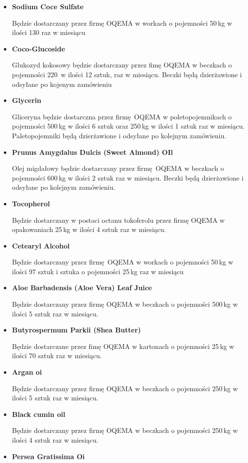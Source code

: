 \begin{itemize}
	\item \textbf{Sodium Coce Sulfate}

		Będzie dostarczany przez firmę \textsf{OQEMA} w workach o pojemności 50\,kg w ilości 130 raz w miesiącu
	\item \textbf{Coco-Glucoside}

		Glukozyd kokosowy będzie dostarczany przez fimę \textsf{OQEMA} w beczkach o pojemności 220\, w ilości 12 sztuk, raz w miesiącu. Beczki będą dzierżawione i odsyłane po kojenym zamówieniu
	\item \textbf{Glycerin}

		Gliceryna będzie dostarczna przez firmę \textsf{OQEMA} w poletopojemnikach o pojemności 500\,kg w ilości 6 sztuk oraz 250\,kg w ilości 1 sztuk raz w miesiącu. Paletopojemniki będą dzierżawione i odsyłane po kolejnym zamówieniu.
	\item \textbf{Prunus Amygdalus Dulcis (Sweet Almond) OIl}

		Olej migdałowy będzie dostarczany przez firmę \textsf{OQEMA} w beczkach o pojemności 600\,kg w ilości 2 sztuk raz w miesiącu. Beczki będą dzierżawione i odsyłane po kolejnym zamówieniu.
	\item \textbf{Tocopherol}

		Będzie dostarczany w postaci octanu tokoferolu przez firmę \textsf{OQEMA} w opakowaniach 25\,kg w ilości 4 sztuk raz w miesiącu.
	\item \textbf{Cetearyl Alcohol}

		Będzie dostarczany przez firmę \textsf{OQEMA} w workach o pojemności 50\,kg w ilości 97 sztuk i sztuka o pojemności 25\,kg raz w miesiącu
	\item \textbf{Aloe Barbadensis (Aloe Vera) Leaf Juice}

	Będzie dostarczany przez firmę \textsf{OQEMA} w beczkach o pojemności 500\,kg w ilości 5 sztuk raz w miesiącu.
	\item \textbf{Butyrospermum Parkii (Shea Butter)}

	Będzie dostarczane przez fimę \textsf{OQEMA} w kartonach o pojemności 25\,kg w ilości 70 sztuk raz w miesiącu.
	\item \textbf{Argan oi}

	Będzie dostarczany przez firmę \textsf{OQEMA} w beczkach o pojemności 250\,kg w ilości 5 sztuk raz w miesiącu.
	\item \textbf{Black cumin oil}

	Będzie dostarczany przez firmę \textsf{OQEMA} w beczkach o pojemności 250\,kg w ilości 4 sztuk raz w miesiącu.
	\item \textbf{Persea Gratissima Oi}


\end{itemize}
